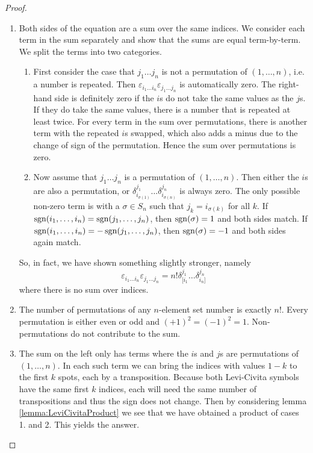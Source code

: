 \begin{proof}
\begin{enumerate}
\item Both sides of the equation are a sum over the same indices. We consider each term in the sum separately and show that the sums are equal term-by-term. We split the terms into two categories.
\begin{enumerate}
\item First consider the case that $j_1\ldots j_n$ is not a permutation of $(1,\ldots, n)$, i.e. a number is repeated. Then $\varepsilon_{i_1\ldots i_n}\varepsilon_{j_1\ldots j_n}$ is automatically zero. The right-hand side is definitely zero if the $i$s do not take the same values as the $j$s. If they do take the same values, there is a number that is repeated at least twice. For every term in the sum over permutations, there is another term with the repeated $i$s swapped, which also adds a minus due to the change of sign of the permutation. Hence the sum over permutations is zero.
\item Now assume that $j_1\ldots j_n$ is a permutation of $(1,\ldots, n)$. Then either the $i$s are also a permutation, or $\delta^{j_1}_{i_{\sigma(1)}} \dots \delta^{j_n}_{i_{\sigma(n)}}$ is always zero. The only possible non-zero term is with a $\sigma\in S_n$ such that $j_k = i_{\sigma(k)}$ for all $k$. If $\operatorname{sgn}(i_1,\ldots, i_n) = \operatorname{sgn}(j_1,\ldots, j_n)$, then $\operatorname{sgn}(\sigma)=1$ and both sides match. If $\operatorname{sgn}(i_1,\ldots, i_n) = -\operatorname{sgn}(j_1,\ldots, j_n)$, then $\operatorname{sgn}(\sigma)=-1$ and both sides again match. 
\end{enumerate}
So, in fact, we have shown something slightly stronger, namely 
\[ \varepsilon_{i_1\ldots i_n}\varepsilon_{j_1\ldots j_n} = n!\delta^{j_1}_{[i_1}\ldots \delta^{j_n}_{i_n]} \]
where there is no sum over indices.
\item The number of permutations of any $n$-element set number is exactly $n!$. Every permutation is either even or odd and $(+1)^2 = (-1)^2 = 1$. Non-permutations do not contribute to the sum.
\item The sum on the left only has terms where the $i$s and $j$s are permutations of $(1,\ldots, n)$. In each such term we can bring the indices with values $1-k$ to the first $k$ spots, each by a transposition. Because both Levi-Civita symbols have the same first $k$ indices, each will need the same number of transpositions and thus the sign does not change. Then by considering lemma \ref{lemma:LeviCivitaProduct} we see that we have obtained a product of cases 1. and 2. This yields the answer.

\end{enumerate}
\end{proof}
